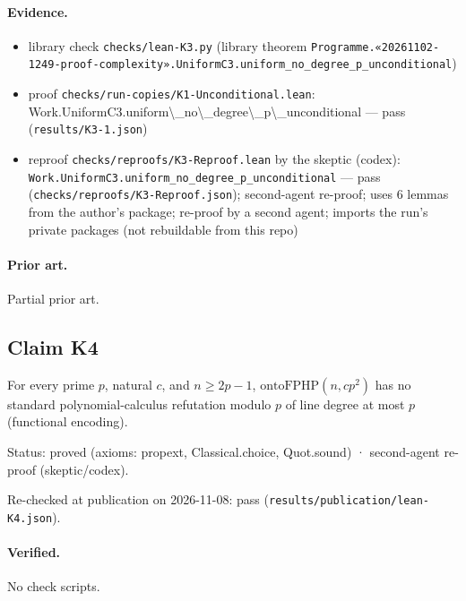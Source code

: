 \documentclass{article}
\begin{document}
\paragraph{Evidence.}
\begin{itemize}
\item library check \texttt{checks/lean-K3.py} (library theorem \texttt{Programme.«20261102-1249-proof-complexity».UniformC3.uniform\_no\_degree\_p\_unconditional})
\item proof \texttt{checks/run-copies/K1-Unconditional.lean}: Work.UniformC3.uniform\textbackslash{}\_no\textbackslash{}\_degree\textbackslash{}\_p\textbackslash{}\_unconditional --- pass (\texttt{results/K3-1.json})
\item reproof \texttt{checks/reproofs/K3-Reproof.lean} by the skeptic (codex): \texttt{Work.UniformC3.uniform\_no\_degree\_p\_unconditional} --- pass (\texttt{checks/reproofs/K3-Reproof.json}); second-agent re-proof; uses 6 lemmas from the author's package; re-proof by a second agent; imports the run's private packages (not rebuildable from this repo)
\end{itemize}

\paragraph{Prior art.} Partial prior art.

\subsection*{Claim K4}

For every prime $p$, natural $c$, and $n\ge2p-1$, $\mathrm{ontoFPHP}(n,cp^2)$ has no standard polynomial-calculus refutation modulo $p$ of line degree at most $p$ (functional encoding).

Status: proved (axioms: propext, Classical.choice, Quot.sound) · second-agent re-proof (skeptic/codex).

Re-checked at publication on 2026-11-08: pass (\texttt{results/publication/lean-K4.json}).

\paragraph{Verified.}
No check scripts.
\end{document}
